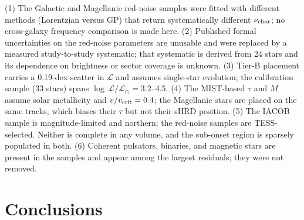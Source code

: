 \documentclass[twocolumn]{aastex631}
\newcommand{\nuchar}{\nu_{\rm char}}
\renewcommand{\ell}{\mathcal{L}}
\newcommand{\lgL}{\log\,\ell/\ell_\odot}
\begin{document}
(1) The Galactic and Magellanic red-noise samples were fitted with different methods (Lorentzian versus GP) that return systematically different $\nuchar$; no cross-galaxy frequency comparison is made here. (2) Published formal uncertainties on the red-noise parameters are unusable and were replaced by a measured study-to-study systematic; that systematic is derived from 24 stars and its dependence on brightness or sector coverage is unknown. (3) Tier-B placement carries a 0.19-dex scatter in $\ell$ and assumes single-star evolution; the calibration sample (33 stars) spans $\lgL=3.2$--4.5. (4) The MIST-based $\tau$ and $M$ assume solar metallicity and $v/v_{\rm crit}=0.4$; the Magellanic stars are placed on the same tracks, which biases their $\tau$ but not their sHRD position. (5) The IACOB sample is magnitude-limited and northern; the red-noise samples are TESS-selected. Neither is complete in any volume, and the sub-onset region is sparsely populated in both. (6) Coherent pulsators, binaries, and magnetic stars are present in the samples and appear among the largest residuals; they were not removed.

\section{Conclusions}\label{sec:conclusions}
\end{document}
